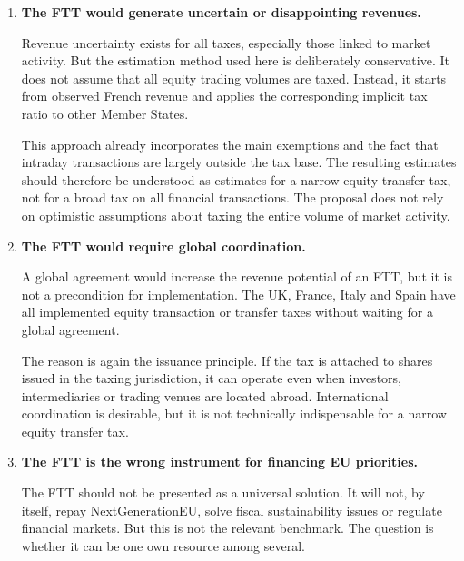 \documentclass[../../main]{subfiles}
\begin{document}
\begin{enumerate}
    That said, the quality of the collection mechanism matters. The French experience also shows that transparency, access to data and administrative control are important. A European own resource should therefore be designed with clear reporting obligations and strong cooperation between tax authorities, market supervisors and settlement infrastructures.

    \item \textbf{The FTT would generate uncertain or disappointing revenues.}

    Revenue uncertainty exists for all taxes, especially those linked to market activity. But the estimation method used here is deliberately conservative. It does not assume that all equity trading volumes are taxed. Instead, it starts from observed French revenue and applies the corresponding implicit tax ratio to other Member States.

    This approach already incorporates the main exemptions and the fact that intraday transactions are largely outside the tax base. The resulting estimates should therefore be understood as estimates for a narrow equity transfer tax, not for a broad tax on all financial transactions. The proposal does not rely on optimistic assumptions about taxing the entire volume of market activity.

    \item \textbf{The FTT would require global coordination.}

    A global agreement would increase the revenue potential of an FTT, but it is not a precondition for implementation. The UK, France, Italy and Spain have all implemented equity transaction or transfer taxes without waiting for a global agreement.

    The reason is again the issuance principle. If the tax is attached to shares issued in the taxing jurisdiction, it can operate even when investors, intermediaries or trading venues are located abroad. International coordination is desirable, but it is not technically indispensable for a narrow equity transfer tax.

    \item \textbf{The FTT is the wrong instrument for financing EU priorities.}

    The FTT should not be presented as a universal solution. It will not, by itself, repay NextGenerationEU, solve fiscal sustainability issues or regulate financial markets. But this is not the relevant benchmark. The question is whether it can be one own resource among several.


\end{enumerate}
\end{document}
